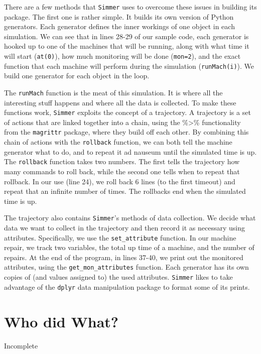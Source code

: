 \documentclass[a4paper, 11pt]{article} %
\begin{document}
There are a few methods that \texttt{Simmer} uses to overcome these issues in building its package. The first one is rather simple. It builds its own version of Python generators. Each generator defines the inner workings of one object in each simulation. We can see that in lines 28-29 of our sample code, each generator is hooked up to one of the machines that will be running, along with what time it will start (\texttt{at(0)}), how much monitoring will be done (\texttt{mon=2}), and the exact function that each machine will perform during the simulation (\texttt{runMach(i)}). We build one generator for each object in the loop.

The \texttt{runMach} function is the meat of this simulation. It is where all the interesting stuff happens and where all the data is collected. To make these functions work, \texttt{Simmer} exploits the concept of a trajectory. A trajectory is a set of actions that are linked together into a chain, using the \%>\% functionality from the \texttt{magrittr} package, where they build off each other. By combining this chain of actions with the \texttt{rollback} function, we can both tell the machine generator what to do, and to repeat it ad nauseum until the simulated time is up. The \texttt{rollback} function takes two numbers. The first tells the trajectory how many commands to roll back, while the second one tells when to repeat that rollback. In our use (line 24), we roll back 6 lines (to the first timeout) and repeat that an infinite number of times. The rollbacks end when the simulated time is up.

The trajectory also contains \texttt{Simmer}'s methods of data collection. We decide what data we want to collect in the trajectory and then record it as necessary using attributes. Specifically, we use the \texttt{set\_attribute} function. In our machine repair, we track two variables, the total up time of a machine, and the number of repairs. At the end of the program, in lines 37-40, we print out the monitored attributes, using the \texttt{get\_mon\_attributes} function. Each generator has its own copies of (and values assigned to) the used attributes. \texttt{Simmer} likes to take advantage of the \texttt{dplyr} data manipulation package to format some of its prints. \newline


\pagebreak


\pagebreak


\section{Who did What?}

Incomplete

\end{document}
